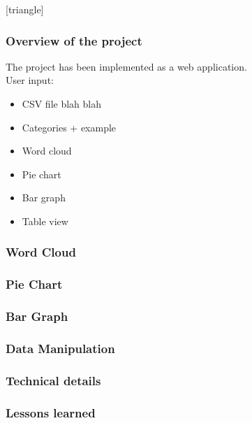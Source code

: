 \documentclass{beamer}
\begin{document}
\begin{frame}
[triangle]
\frametitle{Overview of the project}
The project has been implemented as a web application.\\
\pause
User input:
\pause
\begin{itemize}[<+->]
\item CSV file blah blah
\item Categories + example
\end{itemize}
\begin{itemize}[<+->]
\item Word cloud
\item Pie chart
\item Bar graph
\item Table view
\end{itemize}
\end{frame}

\begin{frame}
\frametitle{Word Cloud}
\end{frame}

\begin{frame}
\frametitle{Pie Chart}
\end{frame}

\begin{frame}
\frametitle{Bar Graph}
\end{frame}

\begin{frame}
\frametitle{Data Manipulation}
\end{frame}

\begin{frame}
\frametitle{Technical details}
\end{frame}

\begin{frame}
\frametitle{Lessons learned}
\end{frame}
\end{document}
